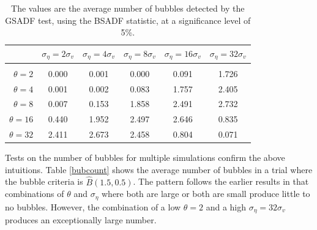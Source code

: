 \documentclass[12pt]{article}
\begin{document}
\begin{table}[h]
    \centering
\begin{tabular}{rccccc}
\hline  
            & \multicolumn{1}{l}{$\sigma_{\eta} =2\sigma_{v}$} & \multicolumn{1}{l}{$\sigma_{\eta} =4\sigma_{v}$} & \multicolumn{1}{l}{$\sigma_{\eta} =8\sigma_{v}$} & \multicolumn{1}{l}{$\sigma_{\eta} =16\sigma_{v}$} & \multicolumn{1}{l}{$\sigma_{\eta} =32\sigma_{v}$} \\ \hline  \vspace{-3mm} \\        
$\theta=2$             & 0.000                        & 0.001                        & 0.000                        & 0.091                         & 1.726                         \\ \hline
$\theta=4$             & 0.001                        & 0.002                        & 0.083                        & 1.757                         & 2.405                         \\ \hline
$\theta=8$             & 0.007                        & 0.153                        & 1.858                        & 2.491                         & 2.732                         \\ \hline
$\theta=16$            & 0.440                        & 1.952                        & 2.497                        & 2.646                         & 0.835                         \\ \hline
$\theta=32$            & 2.411                        & 2.673                        & 2.458                        & 0.804                         & 0.071                         \\ \hline
\end{tabular}
\caption{The values are the average number of bubbles detected by the GSADF test, using the BSADF statistic, at a significance level of 5\%.}
\label{bubcount GSADF}
\end{table}

Tests on the number of bubbles for multiple simulations confirm the above intuitions. Table \ref{bubcount} shows the average number of bubbles in a trial where the bubble criteria is $\widehat{B}(1.5,0.5)$. The pattern follows the earlier results in that combinations of $\theta$ and $\sigma_{\eta}$ where both are large or both are small produce little to no bubbles. However, the combination of a low $\theta=2$ and a high $\sigma_{\eta} =32\sigma_{v}$ produces an exceptionally large number.
\end{document}
